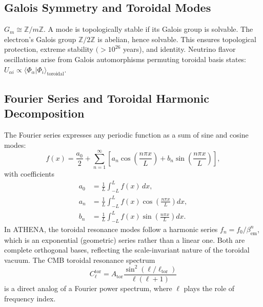\documentclass[12pt, a4paper]{article}
\begin{document}
\subsection{Galois Symmetry and Toroidal Modes}
$G_{m}\cong \mathbb{Z} / m\mathbb{Z}$. A mode is topologically stable if its Galois group is solvable. The electron's Galois group $\mathbb{Z} / 2\mathbb{Z}$ is abelian, hence solvable. This ensures topological protection, extreme stability $(>10^{26}$ years), and identity. Neutrino flavor oscillations arise from Galois automorphisms permuting toroidal basis states: $U_{\alpha i}\propto \langle \Phi_{\alpha}|\Phi_{i}\rangle_{\mathrm{toroidal}}$.

\subsection{Fourier Series and Toroidal Harmonic Decomposition}
The Fourier series expresses any periodic function as a sum of sine and cosine modes:
\begin{equation}
f(x) = \frac{a_0}{2} + \sum_{n=1}^{\infty} \left[ a_n \cos\left(\frac{n\pi x}{L}\right) + b_n \sin\left(\frac{n\pi x}{L}\right) \right],
\end{equation}
with coefficients
\begin{align}
a_0 &= \frac{1}{L} \int_{-L}^{L} f(x)\, dx,\\
a_n &= \frac{1}{L} \int_{-L}^{L} f(x) \cos\left(\frac{n\pi x}{L}\right) dx,\\
b_n &= \frac{1}{L} \int_{-L}^{L} f(x) \sin\left(\frac{n\pi x}{L}\right) dx.
\end{align}
In ATHENA, the toroidal resonance modes follow a harmonic series $f_{n} = f_{0} / \beta_{\mathrm{em}}^{n}$, which is an exponential (geometric) series rather than a linear one. Both are complete orthogonal bases, reflecting the scale-invariant nature of the toroidal vacuum. The CMB toroidal resonance spectrum
\begin{equation}
C_{\ell}^{\mathrm{tor}} = A_{\mathrm{tor}}\frac{\sin^2(\ell / \ell_{\mathrm{tor}})}{\ell(\ell + 1)}
\end{equation}
is a direct analog of a Fourier power spectrum, where $\ell$ plays the role of frequency index.
\end{document}
